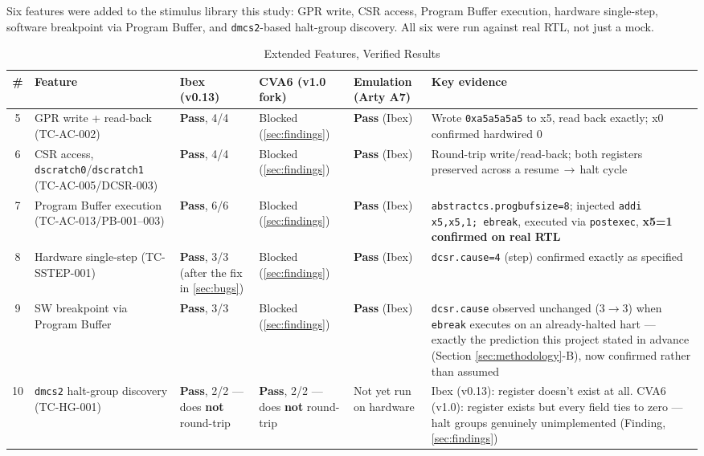 \documentclass[conference]{IEEEtran}
\begin{document}
Six features were added to the stimulus library this study: GPR write, CSR access, Program Buffer execution, hardware single-step, software breakpoint via Program Buffer, and \texttt{dmcs2}-based halt-group discovery. All six were run against real RTL, not just a mock.

\begin{table}[htbp]
\caption{Extended Features, Verified Results}
\label{tab:extended}
\centering
\begin{tabularx}{\textwidth}{@{}clXXXX@{}}
\toprule
\textbf{\#} & \textbf{Feature} & \textbf{Ibex (v0.13)} & \textbf{CVA6 (v1.0 fork)} & \textbf{Emulation (Arty A7)} & \textbf{Key evidence} \\
\midrule
5 & GPR write + read-back (TC-AC-002) & \textbf{Pass}, 4/4 & Blocked (\ref{sec:findings}) & \textbf{Pass} (Ibex) & Wrote \texttt{0xa5a5a5a5} to x5, read back exactly; x0 confirmed hardwired 0 \\
6 & CSR access, \texttt{dscratch0}/\texttt{dscratch1} (TC-AC-005/DCSR-003) & \textbf{Pass}, 4/4 & Blocked (\ref{sec:findings}) & \textbf{Pass} (Ibex) & Round-trip write/read-back; both registers preserved across a resume\,$\rightarrow$\,halt cycle \\
7 & Program Buffer execution (TC-AC-013/PB-001--003) & \textbf{Pass}, 6/6 & Blocked (\ref{sec:findings}) & \textbf{Pass} (Ibex) & \texttt{abstractcs.progbufsize=8}; injected \texttt{addi x5,x5,1; ebreak}, executed via \texttt{postexec}, \textbf{x5=1 confirmed on real RTL} \\
8 & Hardware single-step (TC-SSTEP-001) & \textbf{Pass}, 3/3 (after the fix in \ref{sec:bugs}) & Blocked (\ref{sec:findings}) & \textbf{Pass} (Ibex) & \texttt{dcsr.cause=4} (step) confirmed exactly as specified \\
9 & SW breakpoint via Program Buffer & \textbf{Pass}, 3/3 & Blocked (\ref{sec:findings}) & \textbf{Pass} (Ibex) & \texttt{dcsr.cause} observed unchanged (3$\rightarrow$3) when \texttt{ebreak} executes on an already-halted hart --- exactly the prediction this project stated in advance (Section \ref{sec:methodology}-B), now confirmed rather than assumed \\
10 & \texttt{dmcs2} halt-group discovery (TC-HG-001) & \textbf{Pass}, 2/2 --- does \textbf{not} round-trip & \textbf{Pass}, 2/2 --- does \textbf{not} round-trip & Not yet run on hardware & Ibex (v0.13): register doesn't exist at all. CVA6 (v1.0): register exists but every field ties to zero --- halt groups genuinely unimplemented (Finding, \ref{sec:findings}) \\
\bottomrule
\end{tabularx}
\end{table}
\end{document}

